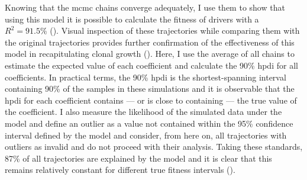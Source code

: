 \begin{figure}[!ht]
	\label{fig:mcmc-ess}
\end{figure}

Knowing that the \ac{mcmc} chains converge adequately, I use them to show that using this model it is possible to calculate the fitness of drivers with a $R^2 = 91.5\%$ (). Visual inspection of these trajectories while comparing them with the original trajectories provides further confirmation of the effectiveness of this model in recapitulating clonal growth (). Here, I use the average of all chains to estimate the expected value of each coefficient and calculate the 90\% \ac{hpdi} for all coefficients. In practical terms, the 90\% \ac{hpdi} is the shortest-spanning interval containing 90\% of the samples in these simulations and it is observable that the \ac{hpdi} for each coefficient contains --- or is close to containing --- the true value of the coefficient. I also measure the likelihood of the simulated data under the model and define an outlier as a value not contained within the 95\% confidence interval defined by the model and consider, from here on, all trajectories with outliers as invalid and do not proceed with their analysis. Taking these standards, 87\% of all trajectories are explained by the model and it is clear that this remains relatively constant for different true fitness intervals ().

\begin{figure}[!ht]
	\label{fig:sim-vs-inf-driver}
\end{figure}

\begin{figure}[!ht]
	\label{fig:trajectory-examples-sim}
\end{figure}

\begin{figure}[!ht]
	\label{fig:explained-traj-sim}
\end{figure}

